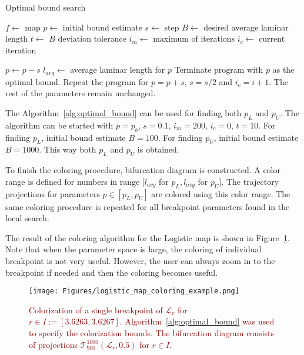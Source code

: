 \begin{algorithm}[!h]
    \caption{Optimal bound search}
    \label{alg:optimal_bound}
    \begin{algorithmic}[1]
        \Statex $f \gets$ map
        \Statex $p \gets$ initial bound estimate
        \Statex $s \gets$ step
        \Statex $B \gets$ desired average laminar length
        \Statex $t \gets$ $B$ deviation tolerance
        \Statex $i_{m} \gets$ maximum of iterations
        \Statex $i_{c} \gets$ current iteration

            \State $p \gets p - s$
            \State $l_{avg} \gets$ average laminar length for $p$
                \State Terminate program with $p$ as the optimal bound.
            \EndIf
                \State Repeat the program for $p = p+s$, $s = s/2$ and $i_{c} = i+1$. The rest of the parameters remain unchanged.
            \EndIf
        \EndFor
    \end{algorithmic}
\end{algorithm}

The Algorithm~\ref{alg:optimal_bound} can be used for finding both $p_L$ and $p_U$.
The algorithm can be started with $p = p_b$, $s = 0.1$, $i_{m} = 200$, $i_{c} = 0$, $t = 10$.
For finding $p_L$, initial bound estimate $B = 100$.
For finding $p_U$, initial bound estimate $B = 1000$.
This way both $p_L$ and $p_U$ is obtained.
\par
To finish the coloring procedure, bifurcation diagram is constructed.
A color range is defined for numbers in range $[ l_{avg}$ for $p_L, l_{avg}$ for $p_U ]$.
The trajectory projections for parameters $p \in [ p_L, p_U ]$ are colored using this color range.
The same coloring procedure is repeated for all breakpoint parameters found in the local search.
\par
The result of the coloring algorithm for the Logistic map is shown in Figure~\ref{fig:coloring_example}.
Note that when the parameter space is large, the coloring of individual breakpoint is not very useful.
However, the user can always zoom in to the breakpoint if needed and then the coloring becomes useful.

\begin{figure}[!h]
    \centering
    \texttt{[image: Figures/logistic\_map\_coloring\_example.png]}
    \caption{
        \textcolor{darkred}{
        Colorization of a single breakpoint of $\mathcal{L}_{r}$ for $r \in I := [ 3.6263, 3.6267 ]$.
        Algorithm~\ref{alg:optimal_bound} was used to specify the colorization bounds.
        The bifurcation diagram consists of projections $\mathcal{T}_{900}^{1000}(\mathcal{L}_{r}, 0.5)$ for $r \in I$.
        }
    }
    \label{fig:coloring_example}
\end{figure}

